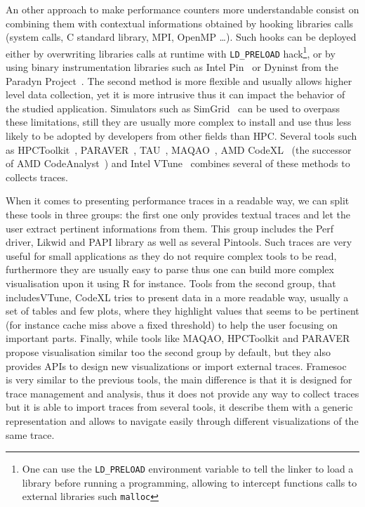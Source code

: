 An other approach to make performance counters more understandable consist on combining them with contextual informations obtained by hooking libraries calls (system calls, C standard library, \gls{MPI}, \gls{OpenMP} \ldots).
Such hooks can be deployed either by overwriting libraries calls at runtime with \texttt{LD\_PRELOAD} hack\footnote{One can use the \texttt{LD\_PRELOAD} environment variable to tell the linker to load a library before running a programming, allowing to intercept functions calls to external libraries such \texttt{malloc}}, or by using binary instrumentation libraries such as \gls{Intel} \gls{Pin}~\cite{Luk05Pin} or Dyninst from the Paradyn Project~\cite{Miller95Paradyn}.
The second method is more flexible and usually allows higher level data collection, yet it is more intrusive thus it can impact the behavior of the studied application.
Simulators such as \gls{SimGrid}~\cite{Casanova14Versatile} can be used to overpass these limitations, still they are usually more complex to install and use thus less likely to be adopted by developers from other fields than \gls{HPC}.
Several tools such as \gls{HPCToolkit}~\cite{Adhianto10HPCTOOLKIT}, \gls{PARAVER}~\cite{Pillet95PARAVER}, \gls{TAU}~\cite{Shende06Tau}, \gls{MAQAO}~\cite{Djoudi05MAQAO}, \gls{AMD} \gls{CodeXL}~\cite{AMD16CodeXL} (the successor of \gls{AMD} \gls{CodeAnalyst}~\cite{Drongowski08introduction}) and \gls{Intel} \gls{VTune}~\cite{Reinders05VTune} combines several of these methods to collects traces.

When it comes to presenting performance traces in a readable way, we can split these tools in three groups: the first one only provides textual traces and let the user extract pertinent informations from them.
This group includes the \gls{Perf} driver, \gls{Likwid} and \gls{PAPI} library as well as several \glspl{Pintool}.
Such traces are very useful for small applications as they do not require complex tools to be read, furthermore they are usually easy to parse thus one can build more complex visualisation upon it using \gls{R} for instance.
Tools from the second group, that includes\gls{VTune}, \gls{CodeXL} tries to present data in a more readable way, usually a set of tables and few plots, where they highlight values that seems to be pertinent (for instance cache miss above a fixed threshold) to help the user focusing on important parts.
Finally, while tools like \gls{MAQAO}, \gls{HPCToolkit} and \gls{PARAVER} propose visualisation similar too the second group by default, but they also provides \glspl{API} to design new visualizations or import external traces.
\gls{Framesoc}~\cite{Pagano13Trace} is very similar to the previous tools, the main difference is that it is designed for trace management and analysis, thus it does not provide any way to collect traces but it is able to import traces from several tools, it  describe them with a generic representation and allows to navigate easily through different visualizations of the same trace.

